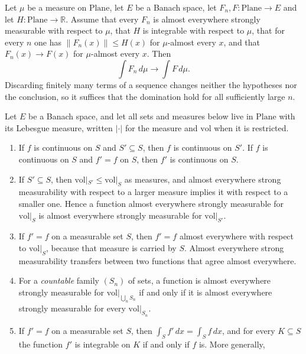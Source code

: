 \begin{proposition}
Let $\mu$ be a measure on $\mathrm{Plane}$, let $E$ be a Banach space, let
$F_n,F\colon\mathrm{Plane}\to E$ and let $H\colon\mathrm{Plane}\to\mathbb{R}$.  Assume that
every $F_n$ is almost everywhere strongly measurable with respect to $\mu$, that $H$ is
integrable with respect to $\mu$, that for every $n$ one has $\lVert F_n(x)\rVert\le H(x)$ for
$\mu$-almost every $x$, and that $F_n(x)\to F(x)$ for $\mu$-almost every $x$.  Then
\[
  \int F_n\,d\mu\longrightarrow\int F\,d\mu .
\]
Discarding finitely many terms of a sequence changes neither the hypotheses nor the conclusion,
so it suffices that the domination hold for all sufficiently large $n$.
\end{proposition}

\begin{proposition}
Let $E$ be a Banach space, and let all sets and measures below live in $\mathrm{Plane}$ with its
Lebesgue measure, written $\lvert\cdot\rvert$ for the measure and $\mathrm{vol}$ when it is
restricted.
\begin{enumerate}
\item If $f$ is continuous on $S$ and $S'\subseteq S$, then $f$ is continuous on $S'$.  If $f$
is continuous on $S$ and $f'=f$ on $S$, then $f'$ is continuous on $S$.
\item If $S'\subseteq S$, then $\mathrm{vol}|_{S'}\le\mathrm{vol}|_{S}$ as measures, and almost
everywhere strong measurability with respect to a larger measure implies it with respect to a
smaller one.  Hence a function almost everywhere strongly measurable for $\mathrm{vol}|_{S}$ is
almost everywhere strongly measurable for $\mathrm{vol}|_{S'}$.
\item If $f'=f$ on a measurable set $S$, then $f'=f$ almost everywhere with respect to
$\mathrm{vol}|_{S}$, because that measure is carried by $S$.  Almost everywhere strong
measurability transfers between two functions that agree almost everywhere.
\item For a \emph{countable} family $(S_n)$ of sets, a function is almost everywhere strongly
measurable for $\mathrm{vol}|_{\bigcup_nS_n}$ if and only if it is almost everywhere strongly
measurable for every $\mathrm{vol}|_{S_n}$.
\item If $f'=f$ on a measurable set $S$, then $\int_Sf'\,dx=\int_Sf\,dx$, and for every
$K\subseteq S$ the function $f'$ is integrable on $K$ if and only if $f$ is.  More generally,

\end{enumerate}
\end{proposition}
